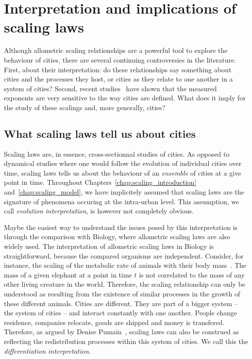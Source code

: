 \chapter{Interpretation and implications of scaling laws}
\label{chap:scaling_implications}

\bigskip

Although allometric scaling relationships are a powerful tool to explore the
behaviour of cities, there are several continuing controversies in the
literature. First, about their interpretation: do these relationships say
something about cities and the processes they host, or cities as they relate to
one another in a system of cities? Second, recent
studies~\cite{Arcaute:2014,Louf:2014_mobility,Cottineau:2015} have shown that
the measured exponents are very sensitive to the way cities are defined. What
does it imply for the study of these scalings and, more generally, cities? 



\section{What scaling laws tell us about cities}

Scaling laws are, in essence, cross-sectionnal
studies of cities. As opposed to dynamical studies where one would follow the
evolution of individual cities over time, scaling laws tells us about the behaviour
of an \emph{ensemble} of cities at a give point in time. Throughout
Chapters~\ref{chap:scaling_introduction} and~\ref{chap:scaling_model}, we have
implicitely assumed that scaling laws are the signature of phenomena occuring at
the intra-urban level. This assumption, we call \emph{evolution interpretation},
is however not completely obvious. 

Maybe the easiest way to understand the issues posed by this interpretation is
through the comparison with Biology, where allometric scaling laws are also
widely used. The interpretation of allometric scaling laws in Biology is
straightforward, because the compared organisms are independent. Consider, for
instance, the scaling of the metabolic rate of animals with their body
mass~\cite{West:1997,Banavar:1999}. The mass of a given elephant at a point in
time $t$ is not correlated to the mass of any other living creature in the
world. Therefore, the scaling relationship can only be understood as resulting
from the existence  of similar processes in the growth of these different
animals.  Cities are different. They are part of a bigger system -- the system
of cities -- and interact constantly with one another. People change residence,
companies relocate, goods are shipped and money is transfered. Therefore, as
argued by Denise Pumain~\cite{Pumain:2012}, scaling laws can also be construed
as reflecting the redistribution processes within this system of cities. We call
this the \emph{differentiation interpretation}.

